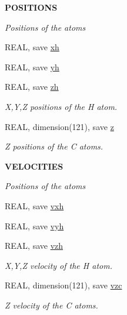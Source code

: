 \begin{Indent}{\bf POSITIONS}\par
{\em \label{_amgrpf3624ebc73536284b7104d42ac395766}
Positions of the atoms }\begin{DoxyCompactItemize}
\item 
REAL, save \hyperlink{namespace_common_data_a54cf378ece8175fe01e142e009cefd6a}{xh}
\item 
REAL, save \hyperlink{namespace_common_data_aefaa9a9c076fac8257c87df0ac2c3f08}{yh}
\item 
REAL, save \hyperlink{namespace_common_data_af47bf8216990a30ef0b9c34a3259fa83}{zh}
\begin{DoxyCompactList}\small\item\em X,Y,Z positions of the H atom. \item\end{DoxyCompactList}\item 
REAL, dimension(121), save \hyperlink{namespace_common_data_a449fb6ff43ccc84909d922ac55097b87}{z}
\begin{DoxyCompactList}\small\item\em Z positions of the C atoms. \item\end{DoxyCompactList}\end{DoxyCompactItemize}
\end{Indent}
\begin{Indent}{\bf VELOCITIES}\par
{\em \label{_amgrp37fcd1f52db2b7fae70aa3f5dfc8df0b}
Positions of the atoms }\begin{DoxyCompactItemize}
\item 
REAL, save \hyperlink{namespace_common_data_a82357dbd5bbd2700a2a5ee66874b8e43}{vxh}
\item 
REAL, save \hyperlink{namespace_common_data_aabc4c29fca54ecb40e7edb7253d05f30}{vyh}
\item 
REAL, save \hyperlink{namespace_common_data_a0d934df8fa7969c9e8b25f8338b68bb7}{vzh}
\begin{DoxyCompactList}\small\item\em X,Y,Z velocity of the H atom. \item\end{DoxyCompactList}\item 
REAL, dimension(121), save \hyperlink{namespace_common_data_ac22677afeff86b9a93bcbb4447a213aa}{vzc}
\begin{DoxyCompactList}\small\item\em Z velocity of the C atoms. \item\end{DoxyCompactList}\end{DoxyCompactItemize}
\end{Indent}
